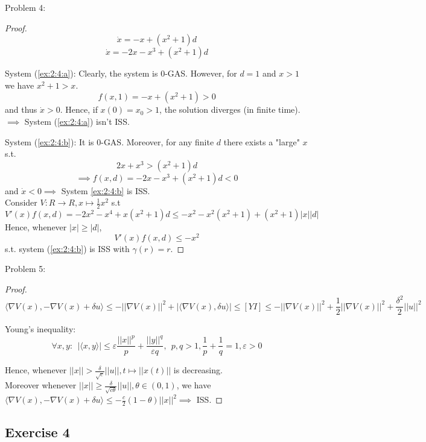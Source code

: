Problem 4:
\begin{proof}
    \begin{equation} \label{ex:2:4:a}
        \dot x = -x + (x^2+1)d
    \end{equation}
        \begin{equation} \label{ex:2:4:b}
        \dot x = -2x -x^3 + (x^2+1)d
    \end{equation}
    
    System (\ref{ex:2:4:a}): Clearly, the system is 0-GAS. However, for $d=1$ and $x>1$ we have $x^2+1>x$.
    $$f(x,1) = -x+(x^2+1)>0$$
    and thus $\dot x>0$. Hence, if $x(0)=x_0>1$, the solution diverges (in finite time).\\
    $\implies$ System (\ref{ex:2:4:a}) isn't ISS.
    
    System (\ref{ex:2:4:b}): It is 0-GAS. Moreover, for any finite $d$ there exists a "large" $x$ s.t.
    $$2x+x^3>(x^2+1)d$$
    $$\implies f(x,d) = -2x-x^3+(x^2+1)d<0$$
    and $\dot x<0 \implies$ System \ref{ex:2:4:b} is ISS.\\
    Consider $V:R \rightarrow R, x \mapsto \frac{1}{2}x^2$ s.t
    $$V'(x)f(x,d)=-2x^2-x^4+x(x^2+1)d \le -x^2-x^2(x^2+1)+(x^2+1)|x||d|$$
    Hence, whenever $|x| \ge |d|$,
    $$V'(x)f(x,d) \le -x^2$$
    s.t. system (\ref{ex:2:4:b}) is ISS with $\gamma (r) = r$.
    \end{proof}
    
    Problem 5:
    \begin{proof}
        $$\langle \nabla V(x),-\nabla V(x)+\delta u\rangle \le -||\nabla V(x)||^2+|\langle \nabla V(x), \delta u \rangle| \le [YI] \le -||\nabla V(x)||^2+\frac{1}{2}||\nabla V(x)||^2+\frac{\delta^2}{2}||u||^2$$
        
        Young's inequality: \\
        $$\forall x,y: \ \ |\langle x,y \rangle| \le \varepsilon \frac{||x||^p}{p}+\frac{||y||^q}{\varepsilon q}, \ \ p,q>1, \frac{1}{p}+\frac{1}{q}=1, \varepsilon>0$$
        
        Hence, whenever $||x||>\frac{\delta}{\sqrt{c}}||u||, t \mapsto ||x(t)||$ is decreasing. \\
        Moreover whenever $||x|| \ge \frac{\delta}{\sqrt{c\theta}}||u||, \theta \in (0,1)$, we have $\langle \nabla V(x),-\nabla V(x)+\delta u\rangle \le -\frac{c}{2}(1-\theta)||x||^2 \implies$ ISS. 
    \end{proof}
    
    \subsection{Exercise 4}
    
